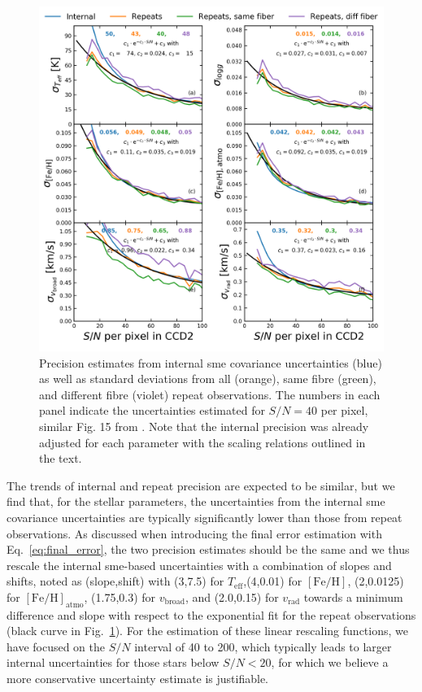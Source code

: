 \documentclass[fleqn,usenatbib,useAMS]{mnras}
\newcommand{\Teff}{$T_\mathrm{eff}$\xspace}
\newcommand{\feh}{$\mathrm{[Fe/H]}$\xspace}
\newcommand{\fehatmo}{$\mathrm{[Fe/H]}_\text{atmo}$\xspace}
\newcommand{\vbroad}{$v_\mathrm{broad}$\xspace}
\newcommand{\vrad}{$v_\mathrm{rad}$\xspace}
\begin{document}
\begin{figure}
\centering
\includegraphics[width=\textwidth]{figures/repeat_uncertainties_snr_flag0.png}
\caption[{Precision estimates for stellar parameters.}]{Precision estimates from internal {\sc sme} covariance uncertainties (blue) as well as standard deviations from all (orange), same fibre (green), and different fibre (violet) repeat observations. The numbers in each panel indicate the uncertainties estimated for $S/N = 40$ per pixel, similar Fig. 15 from \citet{Buder2018}. Note that the internal precision was already adjusted for each parameter with the scaling relations outlined in the text.}
\label{fig:precision_sp}
\end{figure}

The trends of internal and repeat precision are expected to be similar, but we find that, for the stellar parameters, the uncertainties from the internal {\sc sme} covariance uncertainties are typically significantly lower than those from repeat observations. As discussed when introducing the final error estimation with Eq.~\ref{eq:final_error}, the two precision estimates should be the same and we thus rescale the internal {\sc sme}-based uncertainties with a combination of slopes and shifts, noted as (slope,shift) with (3,7.5) for \Teff,(4,0.01) for \feh, (2,0.0125) for \fehatmo, (1.75,0.3) for \vbroad, and (2.0,0.15) for \vrad towards a minimum difference and slope with respect to the exponential fit for the repeat observations (black curve in Fig.~\ref{fig:precision_sp}). For the estimation of these linear rescaling functions, we have focused on the $S/N$ interval of 40 to 200, which typically leads to larger internal uncertainties for those stars below $S/N < 20$, for which we believe a more conservative uncertainty estimate is justifiable.
\end{document}
